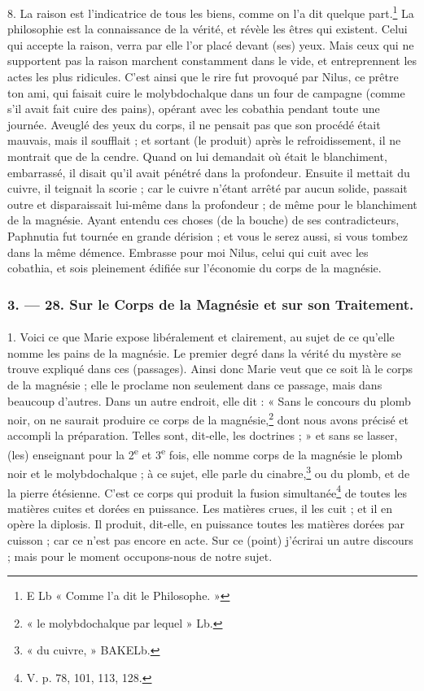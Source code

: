 \documentclass[landscape, a4paper, 11pt, oneside, polutonikogreek, french]{article}
\begin{document}
8. La raison est l'indicatrice de tous les biens, comme on l'a dit quelque part.\footnote{E Lb « Comme l'a dit le Philosophe. »} La philosophie est la connaissance de la vérité, et révèle les êtres qui existent. Celui qui accepte la raison, verra par elle l'or placé devant (ses) yeux. Mais ceux qui ne supportent pas la raison marchent constamment dans le vide, et entreprennent les actes les plus ridicules. C'est ainsi que le rire fut provoqué par Nilus, ce prêtre ton ami, qui faisait cuire le molybdochalque dans un four de campagne (comme s'il avait fait cuire des pains), opérant avec les cobathia pendant toute une journée. Aveuglé des yeux du corps, il ne pensait pas que son procédé était mauvais, mais il soufflait ; et sortant (le produit) après le refroidissement, il ne montrait que de la cendre. Quand on lui demandait où était le blanchiment, embarrassé, il disait qu'il avait pénétré dans la profondeur. Ensuite il mettait du cuivre, il teignait la scorie ; car le cuivre n'étant arrêté par aucun solide, passait outre et disparaissait lui-même dans la profondeur ; de même pour le blanchiment de la magnésie. Ayant entendu ces choses (de la bouche) de ses contradicteurs, Paphnutia fut tournée en grande dérision ; et vous le serez aussi, si vous tombez dans la même démence. Embrasse pour moi Nilus, celui qui cuit avec les cobathia, et sois pleinement édifiée sur l'économie du corps de la magnésie.
\clearpage
\bigskip
\centerline{\EightStarTaper}
\centerline{\EightStarTaper\EightStarTaper}
\bigskip

\subsubsection{3. --- 28. Sur le Corps de la Magnésie et sur son Traitement.}
\paragraph{}
1. Voici ce que Marie expose libéralement et clairement, au sujet de ce qu'elle nomme les pains de la magnésie. Le premier degré dans la vérité du mystère se trouve expliqué dans ces (passages). Ainsi donc Marie veut que ce soit là le corps de la magnésie ; elle le proclame non seulement dans ce passage, mais dans beaucoup d'autres. Dans un autre endroit, elle dit : « Sans le concours du plomb noir, on ne saurait produire ce corps de la magnésie,\footnote{« le molybdochalque par lequel » Lb.} dont nous avons précisé et accompli la préparation. Telles sont, dit-elle, les doctrines ; » et sans se lasser, (les) enseignant pour la 2\textsuperscript{e} et 3\textsuperscript{e} fois, elle nomme corps de la magnésie le plomb noir et le molybdochalque ; à ce sujet, elle parle du cinabre,\footnote{« du cuivre, » BAKELb.} ou du plomb, et de la pierre étésienne. C'est ce corps qui produit la fusion simultanée\footnote{V. p. 78, 101, 113, 128.} de toutes les matières cuites et dorées en puissance. Les matières crues, il les cuit ; et il en opère la diplosis. Il produit, dit-elle, en puissance toutes les matières dorées par cuisson ; car ce n'est pas encore en acte. Sur ce (point) j'écrirai un autre discours ; mais pour le moment occupons-nous de notre sujet.
\end{document}
